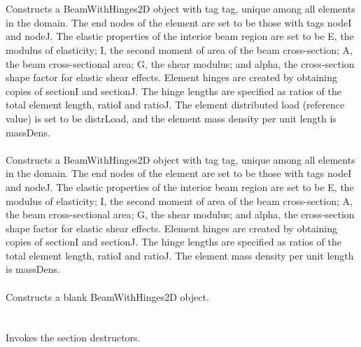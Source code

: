   \\
  \\
Constructs a BeamWithHinges2D object with tag \p tag, unique among all elements
in the domain.  The end nodes of the element are set to be those with tags 
\p nodeI and \p nodeJ.  The elastic properties of the interior beam region
are set to be \p E, the modulus of elasticity; \p I, the second moment of
area of the beam cross-section; \p A, the beam cross-sectional area; \p G,
the shear modulus; and \p alpha, the cross-section shape factor for elastic shear 
effects.  Element hinges are created by obtaining copies of \p sectionI and \p sectionJ.
The hinge lengths are specified as ratios of the total element length, \p ratioI
and \p ratioJ.  The element distributed load (reference value) is set to be \p distrLoad,
and the element mass density per unit length is \p massDens. \\

  \\
Constructs a BeamWithHinges2D object with tag \p tag, unique among all elements
in the domain.  The end nodes of the element are set to be those with tags 
\p nodeI and \p nodeJ.  The elastic properties of the interior beam region
are set to be \p E, the modulus of elasticity; \p I, the second moment of
area of the beam cross-section; \p A, the beam cross-sectional area; \p G,
the shear modulus; and \p alpha, the cross-section shape factor for elastic shear 
effects.  Element hinges are created by obtaining copies of \p sectionI and \p sectionJ.
The hinge lengths are specified as ratios of the total element length, \p ratioI
and \p ratioJ.  The element mass density per unit length is \p massDens. \\

 \\
Constructs a blank BeamWithHinges2D object. \\

 \\
\\ 
Invokes the section destructors. \\

